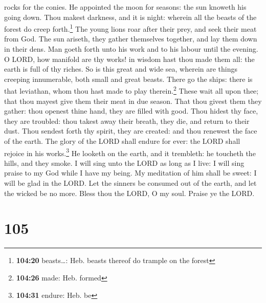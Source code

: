 rocks for the conies.  He appointed the moon for seasons:
the sun knoweth his going down.  Thou makest darkness,
and it is night: wherein all the beasts of the forest do creep
forth.\footnote{\textbf{104:20} beasts\ldots: Heb. beasts thereof do
  trample on the forest}  The young lions roar after
their prey, and seek their meat from God.  The sun
ariseth, they gather themselves together, and lay them down in their
dens.  Man goeth forth unto his work and to his labour
until the evening.  O LORD, how manifold are thy works!
in wisdom hast thou made them all: the earth is full of thy riches.
 So is this great and wide sea, wherein are things
creeping innumerable, both small and great beasts.  There
go the ships: there is that leviathan, whom thou hast made to play
therein.\footnote{\textbf{104:26} made: Heb. formed} 
These wait all upon thee; that thou mayest give them their meat in due
season.  That thou givest them they gather: thou openest
thine hand, they are filled with good.  Thou hidest thy
face, they are troubled: thou takest away their breath, they die, and
return to their dust.  Thou sendest forth thy spirit,
they are created: and thou renewest the face of the earth.
 The glory of the LORD shall endure for ever: the LORD
shall rejoice in his works.\footnote{\textbf{104:31} endure: Heb. be}
 He looketh on the earth, and it trembleth: he toucheth
the hills, and they smoke.  I will sing unto the LORD as
long as I live: I will sing praise to my God while I have my being.
 My meditation of him shall be sweet: I will be glad in
the LORD.  Let the sinners be consumed out of the earth,
and let the wicked be no more. Bless thou the LORD, O my soul. Praise ye
the LORD.

\hypertarget{section-104}{%
\section{105}\label{section-104}}

